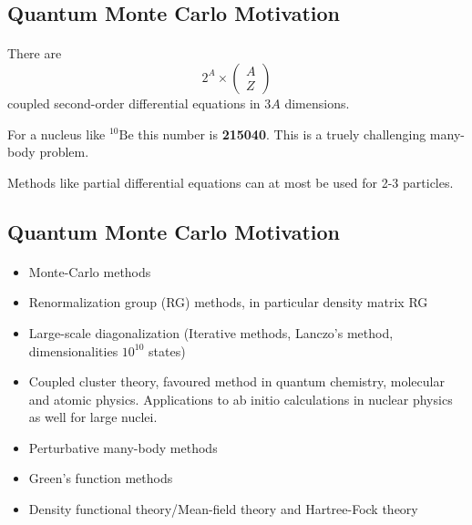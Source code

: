 \documentclass[%
twoside,                 %
final,                   %
10pt]{article}
\begin{document}
\subsection{Quantum Monte Carlo Motivation}

\paragraph{}
There are
\[
 2^A\times \left(\begin{array}{c} A\\ Z\end{array}\right)
\]
coupled second-order differential equations in $3A$ dimensions.

For a nucleus like ${}^{10}\mbox{Be}$ this number is \textbf{215040}.
This is a truely challenging many-body problem.

Methods like partial differential equations can at most be used for 2-3 particles.




\subsection{Quantum Monte Carlo Motivation}

\paragraph{}
\begin{itemize}
\item Monte-Carlo methods

\item Renormalization group (RG) methods, in particular density matrix RG

\item Large-scale diagonalization (Iterative methods, Lanczo's method, dimensionalities  $10^{10}$ states)

\item Coupled cluster theory, favoured method in quantum chemistry, molecular and atomic physics. Applications to ab initio calculations in nuclear physics as well for large nuclei.

\item Perturbative many-body methods 

\item Green's function methods

\item Density functional theory/Mean-field theory and Hartree-Fock theory
\end{itemize}
\end{document}
